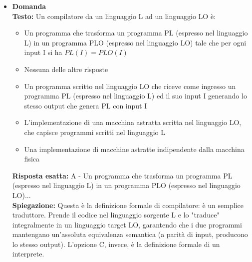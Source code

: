 \documentclass[12pt, a4paper]{article}
\newcounter{domandateoria}
\begin{document}
\begin{itemize}
    \item {}\textbf{Domanda \thedomandateoria} \\
    \textbf{Testo:} Un compilatore da un linguaggio L ad un linguaggio LO è:
    \begin{itemize}
        \item[A)] Un programma che trasforma un programma PL (espresso nel linguaggio L) in un programma PLO (espresso nel linguaggio LO) tale che per ogni input I si ha $PL(I)=PLO(I)$
        \item[B)] Nessuna delle altre risposte
        \item[C)] Un programma scritto nel linguaggio LO che riceve come ingresso un programma PL (espresso nel linguaggio L) ed il suo input I generando lo stesso output che genera PL con input I
        \item[D)] L'implementazione di una macchina astratta scritta nel linguaggio LO, che capisce programmi scritti nel linguaggio L
        \item[E)] Una implementazione di macchine astratte indipendente dalla macchina fisica
    \end{itemize}
    \textbf{Risposta esatta:} A - Un programma che trasforma un programma PL (espresso nel linguaggio L) in un programma PLO (espresso nel linguaggio LO)... \\
    \textbf{Spiegazione:} Questa è la definizione formale di compilatore: è un semplice traduttore. Prende il codice nel linguaggio sorgente L e lo "traduce" integralmente in un linguaggio target LO, garantendo che i due programmi mantengano un'assoluta equivalenza semantica (a parità di input, producono lo stesso output). L'opzione C, invece, è la definizione formale di un interprete.
    \vspace{0.3cm}

    \newpage


\end{itemize}
\end{document}
